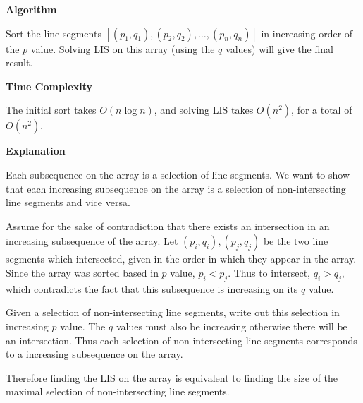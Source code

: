 \documentclass{article}
\begin{document}
\begin{solution}

    \textbf{Algorithm}

    Sort the line segments $[(p_1, q_1), (p_2, q_2), \dots, (p_n, q_n)]$ in increasing order of the $p$ value. Solving LIS on this array (using the $q$ values) will give the final result.

    \textbf{Time Complexity}

    The initial sort takes $O(n\log n)$, and solving LIS takes $O(n^2)$, 
    for a total of $O(n^2)$.

    \textbf{Explanation}

    Each subsequence on the array is a selection of line segments. We want to show that each increasing subsequence on the array is 
     a selection of non-intersecting line segments and vice versa.

    Assume for the sake of contradiction that there exists an intersection in an increasing subsequence of the array.
    Let $(p_i, q_i), (p_j, q_j)$ be the two line segments which intersected, 
    given in the order in which they appear in the array.
    Since the array was sorted based in $p$ value, $p_i < p_j$. 
    Thus to intersect, $q_i > q_j$, which contradicts the fact that this subsequence is increasing on its $q$ value.

    Given a selection of non-intersecting line segments, write out this selection 
    in increasing $p$ value. The $q$ values must also be increasing otherwise there will be
    an intersection. Thus each selection of non-intersecting line segments 
    corresponds to a increasing subsequence on the array.

    Therefore finding the LIS on the array is equivalent to finding the size of the 
    maximal selection of non-intersecting line segments.

    



\end{solution}
\end{document}
